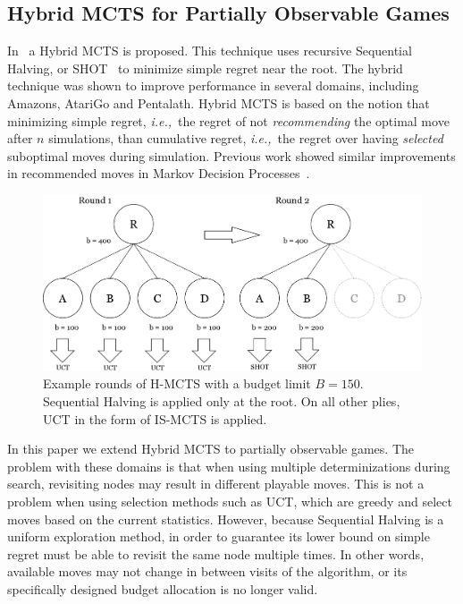 \documentclass[a4paper]{llncs}
\newcommand{\ie}{{\it i.e.,}~}
\begin{document}
\subsection{Hybrid MCTS for Partially Observable Games}
\label{subsec:h-mcts_po}

In~\cite{Pepels14hmcts} a Hybrid MCTS is proposed. This technique uses recursive Sequential Halving, or SHOT~\cite{Cazenave14SHOT} to minimize simple regret near the root. The hybrid technique was shown to improve performance in several domains, including Amazons, AtariGo and Pentalath. Hybrid MCTS is based on the notion that minimizing simple regret, \ie the regret of not \emph{recommending} the optimal move after $n$ simulations, than cumulative regret, \ie the regret over having \emph{selected} suboptimal moves during simulation. Previous work showed similar improvements in recommended moves in Markov Decision Processes~\cite{Feldman12BRUE,tolpin2012mcts}.

\begin{figure}[ht]
	\centering
	\includegraphics[width=.75\textwidth]{img/H-MCTS_Rounds.png}
	\caption[Hybrid MCTS example rounds]{Example rounds of H-MCTS with a budget limit $B = 150$. Sequential Halving is applied only at the root. On all other plies, UCT in the form of IS-MCTS is applied.}
	\label{fig:h-mcts_rounds}
\end{figure}

In this paper we extend Hybrid MCTS to partially observable games. The problem with these domains is that when using multiple determinizations during search, revisiting nodes may result in different playable moves. This is not a problem when using selection methods such as UCT, which are greedy and select moves based on the current statistics. However, because Sequential Halving is a uniform exploration method, in order to guarantee its lower bound on simple regret must be able to revisit the same node multiple times. In other words, available moves may not change in between visits of the algorithm, or its specifically designed budget allocation is no longer valid.
\end{document}
